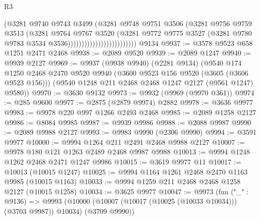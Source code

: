 \begin{lexlean}{R3}
\begin{coremodule}
                                          (@3281
                                            @9740
                                            @9743
                                            @3499
                                            (@3281
                                              @9748
                                              @9751
                                              @3506
                                              (@3281
                                                @9756
                                                @9759
                                                @3513
                                                (@3281
                                                  @9764
                                                  @9767
                                                  @3520
                                                  (@3281
                                                    @9772
                                                    @9775
                                                    @3527
                                                    (@3281
                                                      @9780
                                                      @9783
                                                      @3534
                                                      @3536)))))))))))))))))))))))))
    @9134
@9937 := @3578 @9523 @658 @1251 @2471 @2468
@9938 := @2089 @9520
@9939 := @2089 @1247
@9940 := @9939 @2127
@9969 := @9937
    (@9938 @9940)
    (@2281 @9134)
    (@9540
      @174
      @1250
      @2468
      @2470
      @9520
      @9940
      (@3600 @9523 @156 @9520 (@3605 (@3606 @9523 @156)))
      (@9540 @1248 @211 @2468 @2468 @1247 @2127 (@9561 @1247) @9580))
@9970 := @3630 @9132
@9973 := @9932 (@9969 (@9970 @361))
@9974 := @285 @9600
@9977 := @2875 (@2879 @9974) @2882
@9978 := @3636 @9977
@9983 := @9978 @220 @997 @1266 @2493 @2468
@9985 := @2089 @1258 @2127
@9986 := @8084 @9985
@9987 := @9939 @9986
@9988 := @2088 @9987
@9990 := @2089 @9988 @2127
@9993 := @9983 @9990 (@2306 @9990)
@9994 := @3591 @9977
@10000 := @9994 @1264 @211 @2491 @2468 @9988 @2127
@10007 := @9978 @180 @121 @1263 @2489 @2468 @9987 @9988
@10013 := @9994 @1248 @1262 @2468 @2471 @1247 @9986
@10015 := @3619 @9977 @11
@10017 := @10013 (@10015 @1247)
@10025 := @9994 @1164 @1261 @2468 @2470 @1163 @9985 (@10015 @1163)
@10033 := @9994 @1259 @211 @2468 @2468 @1258 @2127 (@10015 @1258)
@10034 := @3625 @9977
@10047 := @9973
    (fun ("_" : @9136) =>
    @9993 (@10000 (@10007 (@10017 (@10025 (@10033 @10034))) (@3703 @9987)) @10034) (@3709 @9990))

\end{coremodule}
\end{lexlean}
